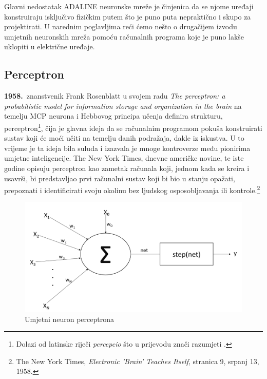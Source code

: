 \documentclass[times, utf8, zavrsni]{fer}
\begin{document}
Glavni nedostatak ADALINE neuronske mreže je činjenica da se njome uređaji konstruiraju isključivo fizičkim putem što je puno puta nepraktično i skupo za projektirati. U narednim poglavljima reći ćemo nešto o drugačijem izvodu umjetnih neuronskih mreža pomoću računalnih programa koje je puno lakše uklopiti u električne uređaje.

\subsection{Perceptron}
\textbf{1958.}\ znanstvenik Frank Rosenblatt u svojem radu \textit{The perceptron: a probabilistic model for information storage and organization in the brain} na temelju MCP neurona i Hebbovog principa učenja definira strukturu, perceptron\footnote{Dolazi od latinske riječi \textit{percepcio} što u prijevodu znači razumjeti .}, čija je glavna ideja da se računalnim programom pokuša konstruirati sustav koji će moći učiti na temelju danih podražaja, dakle iz iskustva. U to vrijeme je ta ideja bila suluda i izazvala je mnoge kontroverze među pionirima umjetne inteligencije. The New York Times, dnevne američke novine, te iste godine opisuju perceptron kao zametak  računala koji, jednom kada se kreira i usavrši, bi predstavljao prvi računalni sustav koji bi bio u stanju opažati, prepoznati i identificirati svoju okolinu bez ljudskog osposobljavanja ili kontrole.\footnote{The New York Times, \textit{Electronic 'Brain' Teaches Itself}, stranica 9, srpanj 13, 1958.}

\begin{figure}[H]
    \centering
    \includegraphics[scale=0.5]{img/step-neuron.png}
    \caption[Caption for LOF]{Umjetni neuron perceptrona\footnotemark}
    \label{fig:step-neuron}
\end{figure}
\end{document}
